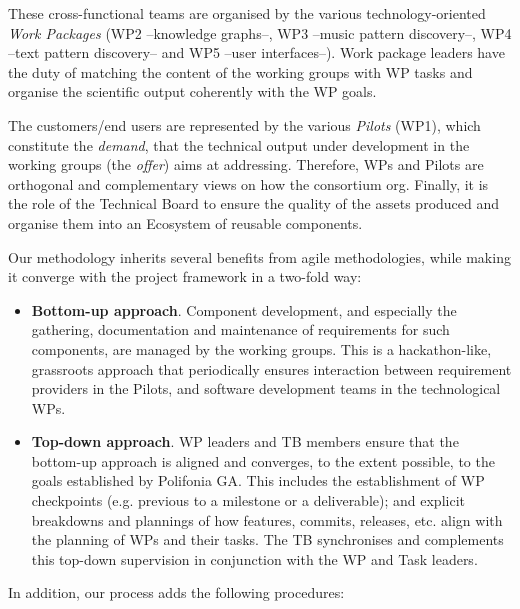 These cross-functional teams are organised by the various technology-oriented \textit{Work Packages} (WP2 --knowledge graphs--, WP3 --music pattern discovery--, WP4 --text pattern discovery-- and WP5 --user interfaces--). 
Work package leaders have the duty of matching the content of the working groups with WP tasks and organise the scientific output coherently with the WP goals.

The customers/end users are represented by the various \textit{Pilots} (WP1), which constitute the \textit{demand}, that the technical output under development in the working groups (the \textit{offer}) aims at addressing. 
Therefore, WPs and Pilots are orthogonal and complementary views on how the consortium org.
Finally, it is the role of the Technical Board to ensure the quality of the assets produced and organise them into an Ecosystem of reusable components.

Our methodology inherits several benefits from agile methodologies, while making it converge with the project framework in a two-fold way:
\begin{itemize}
    \item \textbf{Bottom-up approach}. Component development, and especially the gathering, documentation and maintenance of requirements for such components, are managed by the working groups. This is a hackathon-like, grassroots approach that periodically ensures interaction between requirement providers in the Pilots, and software development teams in the technological WPs.
    \item \textbf{Top-down approach}. WP leaders and TB members ensure that the bottom-up approach is aligned and converges, to the extent possible, to the goals established by Polifonia GA. This includes the establishment of WP checkpoints (e.g. previous to a milestone or a deliverable); and explicit breakdowns and plannings of how features, commits, releases, etc. align with the planning of WPs and their tasks. The TB synchronises and complements this top-down supervision in conjunction with the WP and Task leaders.
\end{itemize}
In addition, our process adds the following procedures:

